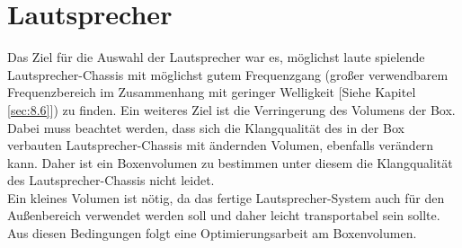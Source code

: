 \section{Lautsprecher}\label{subsec:2.1.2}
Das Ziel für die Auswahl der Lautsprecher war es, möglichst laute spielende Lautsprecher-Chassis mit möglichst gutem Frequenzgang (großer verwendbarem Frequenzbereich im Zusammenhang mit geringer Welligkeit [Siehe Kapitel \ref{sec:8.6}]) zu finden.
Ein weiteres Ziel ist die Verringerung des Volumens der Box.
Dabei muss beachtet werden, dass sich die Klangqualität des in der Box verbauten Lautsprecher-Chassis mit ändernden Volumen, ebenfalls verändern kann.
Daher ist ein Boxenvolumen zu bestimmen unter diesem die Klangqualität des Lautsprecher-Chassis nicht leidet.\\
Ein kleines Volumen ist nötig, da das fertige Lautsprecher-System auch für den Außenbereich verwendet werden soll und daher leicht transportabel sein sollte.
Aus diesen Bedingungen folgt eine Optimierungsarbeit am Boxenvolumen.